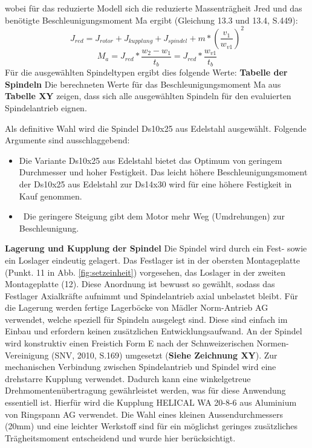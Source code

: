 wobei für das reduzierte Modell sich die reduzierte Massenträgheit Jred und das benötigte Beschleunigungsmoment Ma ergibt (Gleichung 13.3 und 13.4, S.449):
\begin{equation}
J_{red}=J_{rotor}+J_{kupplung}+J_{spindel}+m*(\frac{v_{1}}{w_{v1}})^{2}
\end{equation}
\begin{equation}
M_{a}=J_{red}*\frac{w_{2}-w_{1}}{t_{b}}=J_{red}*\frac{w_{v1}}{t_{b}}
\end{equation}
Für die ausgewählten Spindeltypen ergibt dies folgende Werte:
\newline
\textbf{Tabelle der Spindeln}
Die berechneten Werte für das Beschleunigungsmoment Ma aus \textbf{Tabelle XY} zeigen, dass sich alle ausgewählten Spindeln für den evaluierten Spindelantrieb eignen.
\newline
\newline

Als definitive Wahl wird die Spindel Ds10x25 aus Edelstahl ausgewählt. Folgende Argumente sind ausschlaggebend:
	\begin{itemize}
	\item Die Variante Ds10x25 aus Edelstahl bietet das Optimum von geringem Durchmesser und hoher Festigkeit. Das leicht höhere Beschleunigungsmoment der Ds10x25 aus Edelstahl zur Ds14x30 wird für eine höhere Festigkeit in Kauf genommen.
	
	\item \ Die geringere Steigung gibt dem Motor mehr Weg (Umdrehungen) zur Beschleunigung.
\end{itemize}
\textbf{Lagerung und Kupplung der Spindel}
\newline
Die Spindel wird durch ein Fest- sowie ein Loslager eindeutig gelagert. Das Festlager ist in der obersten Montageplatte (Punkt. 11 in Abb. \ref{fig:setzeinheit}) vorgesehen, das Loslager in der zweiten Montageplatte (12). Diese Anordnung ist bewusst so gewählt, sodass das Festlager Axialkräfte aufnimmt und Spindelantrieb axial unbelastet bleibt. Für die Lagerung werden fertige Lagerböcke von Mädler Norm-Antrieb AG verwendet, welche speziell für Spindeln ausgelegt sind. Diese sind einfach im Einbau und erfordern keinen zusätzlichen Entwicklungsaufwand. An der Spindel wird konstruktiv einen Freistich Form E nach der Schnweizerischen Normen-Vereinigung (SNV, 2010, S.169) umgesetzt (\textbf{Siehe Zeichnung XY}).
\newline
Zur mechanischen Verbindung zwischen Spindelantrieb und Spindel wird eine drehstarre Kupplung verwendet. Dadurch kann eine winkelgetreue Drehmomentenübertragung gewährleistet werden, was für diese Anwendung essentiell ist. Hierfür wird die Kupplung HELICAL WA 20-8-6 aus Aluminium von Ringspann AG verwendet. Die Wahl eines kleinen Aussendurchmessers (20mm) und eine leichter Werkstoff sind für ein möglichst geringes zusätzliches Trägheitsmoment entscheidend und wurde hier berücksichtigt.
